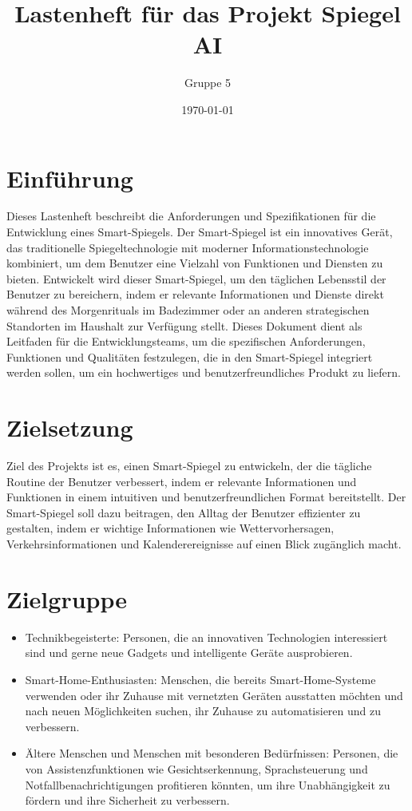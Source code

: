 \documentclass{article}
\title{Lastenheft für das Projekt Spiegel AI}
\author{Gruppe 5}
\date{\today}
\begin{document}
\maketitle

\section{Einführung}
Dieses Lastenheft beschreibt die Anforderungen und Spezifikationen für die Entwicklung eines Smart-Spiegels. Der Smart-Spiegel ist ein innovatives Gerät, das traditionelle Spiegeltechnologie mit moderner Informationstechnologie kombiniert, um dem Benutzer eine Vielzahl von Funktionen und Diensten zu bieten. Entwickelt wird dieser Smart-Spiegel, um den täglichen Lebensstil der Benutzer zu bereichern, indem er relevante Informationen und Dienste direkt während des Morgenrituals im Badezimmer oder an anderen strategischen Standorten im Haushalt zur Verfügung stellt. Dieses Dokument dient als Leitfaden für die Entwicklungsteams, um die spezifischen Anforderungen, Funktionen und Qualitäten festzulegen, die in den Smart-Spiegel integriert werden sollen, um ein hochwertiges und benutzerfreundliches Produkt zu liefern.

\section{Zielsetzung}

Ziel des Projekts ist es, einen Smart-Spiegel zu entwickeln, der die tägliche Routine der Benutzer verbessert, indem er relevante Informationen und Funktionen in einem intuitiven und benutzerfreundlichen Format bereitstellt. Der Smart-Spiegel soll dazu beitragen, den Alltag der Benutzer effizienter zu gestalten, indem er wichtige Informationen wie Wettervorhersagen, Verkehrsinformationen und Kalenderereignisse auf einen Blick zugänglich macht.  

\section{Zielgruppe}
\begin{itemize}
    \item Technikbegeisterte: Personen, die an innovativen Technologien interessiert sind und gerne neue Gadgets und intelligente Geräte ausprobieren.
    \item Smart-Home-Enthusiasten: Menschen, die bereits Smart-Home-Systeme verwenden oder ihr Zuhause mit vernetzten Geräten ausstatten möchten und nach neuen Möglichkeiten suchen, ihr Zuhause zu automatisieren und zu verbessern.
    \item Ältere Menschen und Menschen mit besonderen Bedürfnissen: Personen, die von Assistenzfunktionen wie Gesichtserkennung, Sprachsteuerung und Notfallbenachrichtigungen profitieren könnten, um ihre Unabhängigkeit zu fördern und ihre Sicherheit zu verbessern.
\end{itemize}
\end{document}
